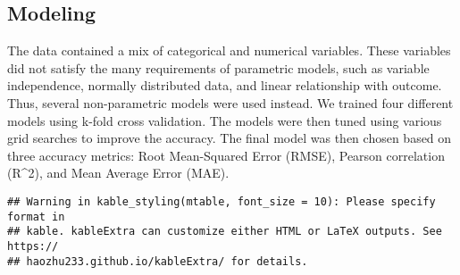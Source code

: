 \documentclass[11pt,]{article}
\begin{document}
\hypertarget{modeling-1}{%
\subsection{Modeling}\label{modeling-1}}

The data contained a mix of categorical and numerical variables. These
variables did not satisfy the many requirements of parametric models,
such as variable independence, normally distributed data, and linear
relationship with outcome. Thus, several non-parametric models were used
instead. We trained four different models using k-fold cross validation.
The models were then tuned using various grid searches to improve the
accuracy. The final model was then chosen based on three accuracy
metrics: Root Mean-Squared Error (RMSE), Pearson correlation (R\^{}2),
and Mean Average Error (MAE).

\begin{verbatim}
## Warning in kable_styling(mtable, font_size = 10): Please specify format in
## kable. kableExtra can customize either HTML or LaTeX outputs. See https://
## haozhu233.github.io/kableExtra/ for details.
\end{verbatim}
\end{document}
